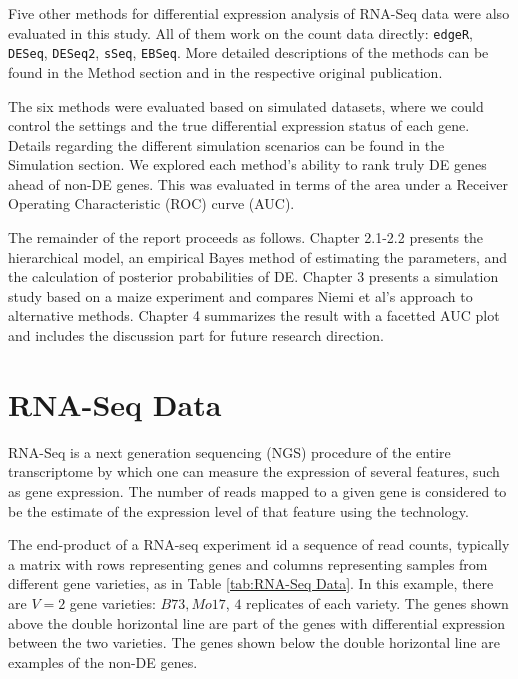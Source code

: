 Five other methods for differential expression analysis of RNA-Seq data were also evaluated in this study. All of them work on the count data directly: {\tt edgeR}\citep{robinson2010edger}, {\tt DESeq}\citep{anders2010differential}, {\tt DESeq2}\citep{love2014moderated}, {\tt sSeq}\citep{yu2013sseq}, {\tt EBSeq}\citep{leng2013ebseq}. More detailed descriptions of the methods can be found in the Method section and in the respective original publication. 

The six methods were evaluated based on simulated datasets, where we could control the settings and the true differential expression status of each gene. Details regarding the different simulation scenarios can be found in the Simulation section. We explored each method's ability to rank truly DE genes ahead of non-DE genes. This was evaluated in terms of the area under a Receiver Operating Characteristic (ROC) curve (AUC). 

The remainder of the report proceeds as follows. Chapter 2.1-2.2 presents the hierarchical model, an empirical Bayes method of estimating the parameters, and the calculation of posterior probabilities of DE. Chapter 3 presents a simulation study based on a maize experiment and compares Niemi et al's approach to alternative methods. Chapter 4 summarizes the result with a facetted AUC plot and includes the discussion part for future research direction. 


\section{RNA-Seq Data}

RNA-Seq is a next generation sequencing (NGS) procedure of the entire transcriptome by which one can measure the expression of several features, such as gene expression. The number of reads mapped to a given gene is considered to be the estimate of the expression level of that feature using the technology\citep{marioni2008rna}.

The end-product of a RNA-seq experiment id a sequence of read counts, typically a matrix with rows representing genes and columns representing samples from different gene varieties, as in Table \ref{tab:RNA-Seq Data}. In this example, there are $V=2$ gene varieties: $B73, Mo17$, $4$ replicates of each variety. The genes shown above the double horizontal line are part of the genes with differential expression between the two varieties. The genes shown below the double horizontal line are examples of the non-DE genes. 

